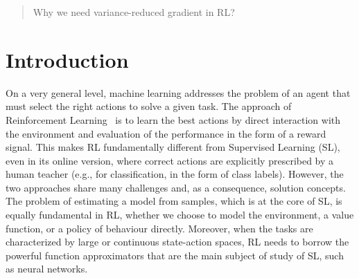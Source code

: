 \documentclass{article}
\makeatletter
\theoremstyle{remark}
\theoremstyle{definition}
\DeclareRobustCommand{\eg}{e.g.,\@\xspace}
\makeatother
\begin{document}
\begin{abstract}
Why we need variance-reduced gradient in RL?
\end{abstract}

\section{Introduction}
On a very general level, machine learning addresses the problem of an agent that must select the right actions to solve a given task. The approach of Reinforcement Learning~\citep{sutton1998reinforcement} is to learn the best actions by direct interaction with the environment and evaluation of the performance in the form of a reward signal. This makes RL fundamentally different from Supervised Learning (SL), even in its online version, where correct actions are explicitly prescribed by a human teacher (\eg for classification, in the form of class labels). However, the two approaches share many challenges and, as a consequence, solution concepts. The problem of estimating a model from samples, which is at the core of SL, is equally fundamental in RL, whether we choose to model the environment, a value function, or a policy of behaviour directly. Moreover, when the tasks are characterized by large or continuous state-action spaces, RL needs to borrow the powerful function approximators that are the main subject of study of SL, such as neural networks.
\end{document}
